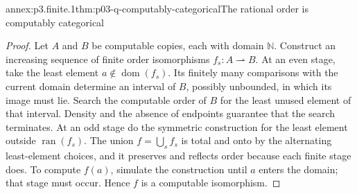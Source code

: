 
\begin{annexitem}{annex:p3.finite.1}{thm:p03-q-computably-categorical}{The rational order is computably categorical}
\begin{proof}
Let \(A\) and \(B\) be computable copies, each with domain \(\mathbb N\).
Construct an increasing sequence of finite order isomorphisms
\(f_s:A\rightharpoonup B\).  At an even stage, take the least element
\(a\notin\operatorname{dom}(f_s)\).  Its finitely many comparisons with the
current domain determine an interval of \(B\), possibly unbounded, in which
its image must lie.  Search the computable order of \(B\) for the least unused
element of that interval.  Density and the absence of endpoints guarantee
that the search terminates.  At an odd stage do the symmetric construction
for the least element outside \(\operatorname{ran}(f_s)\).  The union
\(f=\bigcup_s f_s\) is total and onto by the alternating least-element choices,
and it preserves and reflects order because each finite stage does.  To
compute \(f(a)\), simulate the construction until \(a\) enters the domain;
that stage must occur.  Hence \(f\) is a computable isomorphism.
\end{proof}
\end{annexitem}

